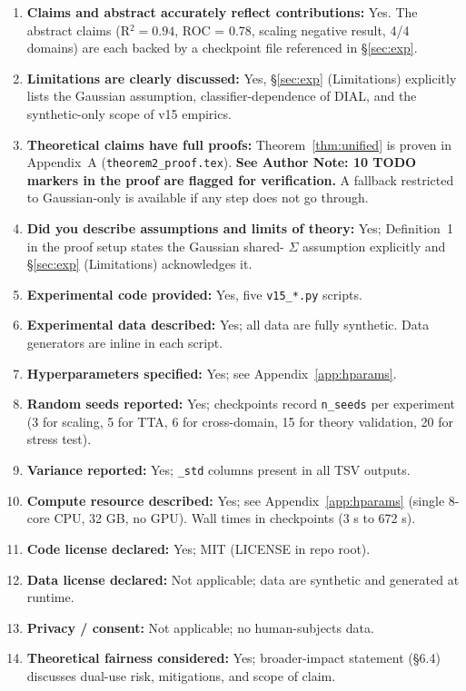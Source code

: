\begin{enumerate}
\item \textbf{Claims and abstract accurately reflect contributions:}
  Yes. The abstract claims (R$^2 = 0.94$, ROC = 0.78, scaling
  negative result, 4/4 domains) are each backed by a checkpoint
  file referenced in \S\ref{sec:exp}.

\item \textbf{Limitations are clearly discussed:} Yes,
  \S\ref{sec:exp} (Limitations) explicitly lists the Gaussian
  assumption, classifier-dependence of DIAL, and the synthetic-only
  scope of v15 empirics.

\item \textbf{Theoretical claims have full proofs:} Theorem~\ref{thm:unified}
  is proven in Appendix~A (\texttt{theorem2\_proof.tex}). \textbf{See
  Author Note: 10 TODO markers in the proof are flagged for
  verification.} A fallback restricted to Gaussian-only is
  available if any step does not go through.

\item \textbf{Did you describe assumptions and limits of theory:}
  Yes; Definition~1 in the proof setup states the Gaussian shared-
  $\Sigma$ assumption explicitly and \S\ref{sec:exp} (Limitations)
  acknowledges it.

\item \textbf{Experimental code provided:} Yes, five
  \texttt{v15\_*.py} scripts.

\item \textbf{Experimental data described:} Yes; all data are fully
  synthetic. Data generators are inline in each script.

\item \textbf{Hyperparameters specified:} Yes; see
  Appendix~\ref{app:hparams}.

\item \textbf{Random seeds reported:} Yes; checkpoints record
  \texttt{n\_seeds} per experiment (3 for scaling, 5 for TTA, 6 for
  cross-domain, 15 for theory validation, 20 for stress test).

\item \textbf{Variance reported:} Yes; \texttt{\_std} columns present
  in all TSV outputs.

\item \textbf{Compute resource described:} Yes; see
  Appendix~\ref{app:hparams} (single 8-core CPU, 32 GB, no GPU).
  Wall times in checkpoints (3 s to 672 s).

\item \textbf{Code license declared:} Yes; MIT (LICENSE in repo
  root).

\item \textbf{Data license declared:} Not applicable; data are
  synthetic and generated at runtime.

\item \textbf{Privacy / consent:} Not applicable; no human-subjects
  data.

\item \textbf{Theoretical fairness considered:} Yes; broader-impact
  statement (\S6.4) discusses dual-use risk, mitigations, and
  scope of claim.
\end{enumerate}



